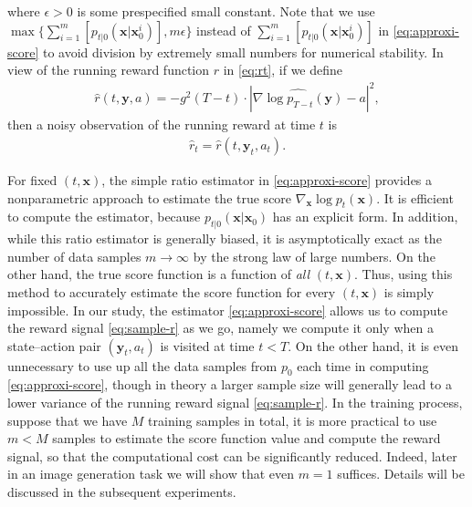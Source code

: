 \documentclass[11pt]{article}
\begin{document}
where $\epsilon>0$ is some prespecified small constant.
Note that we use $\max\{ \sum_{i=1}^m  [ p_{t|0}(\mathbf{x} | \mathbf{x}^i_{0})], m \epsilon \}$ instead of $\sum_{i=1}^m  [ p_{t|0}(\mathbf{x} | \mathbf{x}^i_{0})]$ in \eqref{eq:approxi-score} to avoid division by extremely small numbers for numerical stability. In view of the running reward function $r$ in \eqref{eq:rt}, if we define
\begin{align}\label{eq:hat-r}
\hat r(t, \mathbf{y}, a) = -g^2(T-t) \cdot {|  \widehat{ \nabla\log p_{T- t}(\mathbf{y}) }  - a|^2},
\end{align}
then a noisy observation of the running reward at time $t$ is
\begin{align}\label{eq:sample-r}
\hat r_t =  \hat r(t, \mathbf{y}_t, a_t).
\end{align}


For fixed $(t,\mathbf{x})$, the simple ratio estimator in \eqref{eq:approxi-score} provides a nonparametric approach to estimate the true score $\nabla_{\mathbf{x}}\log p_{t}(\mathbf{x})$. It is efficient to compute the estimator, because $p_{t|0}(\mathbf{x}|\mathbf{x}_{0})$ has an explicit form. In addition, while this ratio estimator is generally biased, it is asymptotically exact as the number of data samples $m \rightarrow \infty$ by the strong law of large numbers. On the other hand,  the true score function is a function of {\it all} $(t,\mathbf{x})$. Thus, using this method to accurately estimate the score function for every $(t,\mathbf{x})$ is simply impossible. %
In our study, the estimator  \eqref{eq:approxi-score} allows us to compute the reward signal \eqref{eq:sample-r} as we go, namely we compute it only when a state--action pair $(\mathbf{y}_t, a_t) $ is visited at time $t <T$. On the other hand, it is even unnecessary to use up all the data samples from $p_0$ each time in computing \eqref{eq:approxi-score}, though in theory a larger sample size will generally lead to a lower variance of the running reward signal \eqref{eq:sample-r}. In the training process, suppose that we have $M$ training samples in total, it is more practical to use $m < M$ samples to estimate the score function value and compute the reward signal, so that the computational cost can be significantly  reduced. Indeed, later in an image generation task we will show that even $m=1$ suffices. Details will be discussed in the subsequent experiments.
\end{document}
